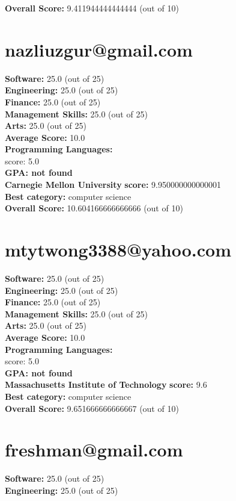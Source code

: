 \documentclass{article}
\begin{document}
    \textbf{Overall Score: }9.411944444444444 (out of 10)\section{nazliuzgur@gmail.com}
\textbf{Software:} 25.0 (out of 25)\\
    \textbf{Engineering: } 25.0 (out of 25)\\
    \textbf{Finance:} 25.0 (out of 25)\\
    \textbf{Management Skills:} 25.0 (out of 25)\\
    \textbf{Arts:} 25.0 (out of 25)\\
\textbf{Average Score: } 10.0\\
\textbf{Programming Languages:} \\
score: 5.0\\
\textbf{GPA: not found}\\
\textbf{Carnegie Mellon University} \textbf{score:} 9.950000000000001\\
\textbf{Best category: } computer science\\
    \textbf{Overall Score: }10.604166666666666 (out of 10)\section{mtytwong3388@yahoo.com}
\textbf{Software:} 25.0 (out of 25)\\
    \textbf{Engineering: } 25.0 (out of 25)\\
    \textbf{Finance:} 25.0 (out of 25)\\
    \textbf{Management Skills:} 25.0 (out of 25)\\
    \textbf{Arts:} 25.0 (out of 25)\\
\textbf{Average Score: } 10.0\\
\textbf{Programming Languages:} \\
score: 5.0\\
\textbf{GPA: not found}\\
\textbf{Massachusetts Institute of Technology} \textbf{score:} 9.6\\
\textbf{Best category: } computer science\\
    \textbf{Overall Score: }9.651666666666667 (out of 10)\section{freshman@gmail.com}
\textbf{Software:} 25.0 (out of 25)\\
    \textbf{Engineering: } 25.0 (out of 25)\\
\end{document}
